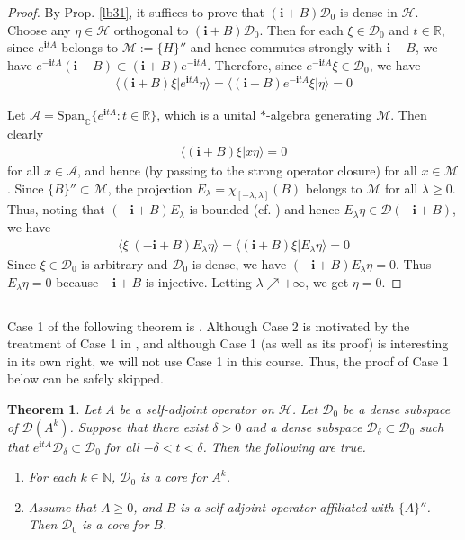 \documentclass[12pt,b5paper,notitlepage]{article}
\theoremstyle{definition}
\theoremstyle{plain}
\newtheorem{thm}[df]{Theorem}
\newcommand{\mc}{\mathcal}
\newcommand{\Dom}{\scr{D}}
\newcommand{\Span}{\mathrm{Span}}
\newcommand{\bk}[1]{\langle {#1}\rangle}
\newcommand{\scr}{\mathscr}
\newcommand{\im}{\mathbf{i}}
\newcommand{\Cbb}{\mathbb C}
\newcommand{\Nbb}{\mathbb N}
\newcommand{\Rbb}{\mathbb R}
\numberwithin{equation}{section}
\begin{document}
\begin{proof}
By Prop. \ref{lb31}, it suffices to prove that $(\im+B)\Dom_0$ is dense in $\mc H$. Choose any $\eta\in\mc H$ orthogonal to $(\im+B)\Dom_0$. Then for each $\xi\in\Dom_0$ and $t\in\Rbb$, since $e^{\im tA}$ belongs to $\mc M:=\{H\}''$ and hence commutes strongly with $\im+B$, we have $e^{-\im tA}(\im+B)\subset(\im+B)e^{-\im tA}$. Therefore, since $e^{-\im tA}\xi\in\Dom_0$, we have
\begin{align*}
\bk{(\im+B)\xi|e^{\im tA}\eta}=\bk{(\im+B)e^{-\im tA}\xi|\eta}=0
\end{align*}

Let $\scr A=\Span_\Cbb\{e^{\im tA}:t\in\Rbb\}$, which is a unital $*$-algebra generating $\mc M$. Then clearly
\begin{align*}
\bk{(\im+B)\xi|x\eta}=0
\end{align*}
for all $x\in\scr A$, and hence (by passing to the strong operator closure) for all $x\in\mc M$. Since $\{B\}''\subset\mc M$, the projection $E_\lambda=\chi_{[-\lambda,\lambda]}(B)$ belongs to $\mc M$ for all $\lambda\geq0$. Thus, noting that $(-\im+B)E_\lambda$ is bounded (cf. \cite[Prop. 8.1]{Gui-S}) and hence $E_\lambda\eta\in\Dom(-\im+B)$, we have
\begin{align*}
\bk{\xi|(-\im+B)E_\lambda\eta}=\bk{(\im+B)\xi|E_\lambda\eta}=0
\end{align*}
Since $\xi\in\Dom_0$ is arbitrary and $\Dom_0$ is dense, we have $(-\im+B)E_\lambda\eta=0$. Thus $E_\lambda\eta=0$ because $-\im+B$ is injective. Letting $\lambda\nearrow+\infty$, we get $\eta=0$.
\end{proof}


\subsection{}

Case 1 of the following theorem is \cite[Lem.7.2]{CKLW18}. Although Case 2 is motivated by the treatment of Case 1 in \cite{CKLW18}, and although Case 1 (as well as its proof) is interesting in its own right, we will not use Case 1 in this course. Thus, the proof of Case 1 below can be safely skipped.

\begin{thm}
Let $A$ be a self-adjoint operator on $\mc H$. Let $\Dom_0$ be a dense subspace of $\Dom(A^k)$. Suppose that there exist $\delta>0$ and a dense subspace $\Dom_\delta\subset\Dom_0$ such that $e^{\im tA}\Dom_\delta\subset\Dom_0$ for all $-\delta<t<\delta$. Then the following are true.
\begin{enumerate}
\item For each $k\in\Nbb$, $\Dom_0$ is a core for $A^k$.
\item Assume that $A\geq0$, and $B$ is a self-adjoint operator affiliated with $\{A\}''$. Then $\Dom_0$ is a core for $B$.
\end{enumerate} 
\end{thm}
\end{document}
